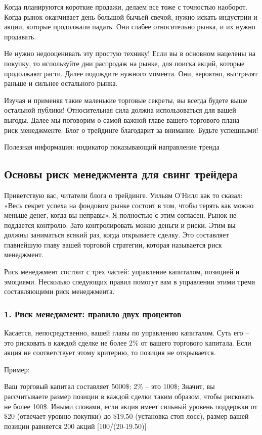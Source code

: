 \documentclass{book}
\begin{document}
Когда планируются короткие продажи, делаем все тоже с точностью наоборот.  Когда рынок оканчивает день большой бычьей свечой, нужно искать индустрии и акции, которые продолжали падать. Они слабее относительно рынка, и их нужно продавать.

Не нужно недооценивать эту простую технику! Если вы в основном нацелены на покупку, то используйте дни распродаж на рынке, для поиска акций, которые продолжают расти. Далее подождите нужного момента. Они, вероятно, выстрелят раньше и сильнее остального рынка.

Изучая и применяя такие маленькие торговые секреты, вы всегда будете выше остальной публики! Относительная сила должна использоваться для вашей выгоды. Далее мы поговорим о самой важной главе вашего торгового плана — риск менеджменте. Блог о трейдинге благодарит за внимание. Будьте успешными!


Полезная информация: индикатор показывающий направление тренда

\subsection{Основы риск менеджмента для свинг трейдера}

Приветствую вас, читатели блога о трейдинге. Уильям О'Нилл как то сказал: «Весь секрет успеха на фондовом рынке состоит в том, чтобы терять как можно меньше денег, когда вы неправы». Я полностью с этим согласен. Рынок не поддается контролю. Зато контролировать можно деньги и риски. Этим вы должны заниматься всякий раз, когда открываете сделку. Это  составляет главнейшую главу вашей торговой стратегии, которая называется риск менеджмент.

Риск менеджмент состоит с трех частей: управление капиталом, позицией
и эмоциями. Несколько следующих правил помогут вам в управлении этими
тремя составляющими риск менеджмента.

\subsubsection{1. Риск менеджмент: правило двух процентов}

Касается, непосредственно, вашей главы по управлению капиталом. Суть его – это рисковать в каждой сделке не более 2\% от вашего торгового капитала. Если акция не соответствует этому критерию, то позиция не открывается.

Пример:

    Ваш торговый капитал составляет 5000\$; 2\% – это 100\$;
    Значит, вы рассчитываете размер позиции в каждой сделки таким образом, чтобы рисковать не более 100\$. Иными словами, если акция имеет сильный уровень поддержки от \$20 (отвечает уровню покупки) до \$19.50 (установка стоп лосс),  размер вашей позиции равняется 200 акций [100/(20-19.50)]
\end{document}
